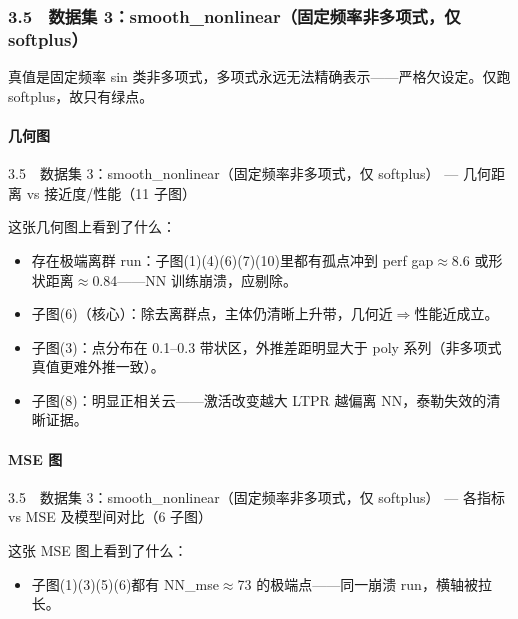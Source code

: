 \documentclass[UTF8,a4paper,11pt]{ctexart}
\begin{document}
\subsubsection{3.5　数据集 3：smooth\_nonlinear（固定频率非多项式，仅 softplus）}

真值是固定频率 sin 类非多项式，多项式永远无法精确表示------严格欠设定。仅跑 softplus，故只有绿点。

\paragraph{几何图}

3.5　数据集 3：smooth\_nonlinear（固定频率非多项式，仅 softplus） --- 几何距离 vs 接近度/性能（11 子图）

这张几何图上看到了什么：

\begin{itemize}
\item 存在极端离群 run：子图(1)(4)(6)(7)(10)里都有孤点冲到 perf gap$\approx$8.6 或形状距离$\approx$0.84------NN 训练崩溃，应剔除。
\end{itemize}

\begin{itemize}
\item 子图(6)（核心）：除去离群点，主体仍清晰上升带，几何近$\Rightarrow$性能近成立。
\end{itemize}

\begin{itemize}
\item 子图(3)：点分布在 0.1--0.3 带状区，外推差距明显大于 poly 系列（非多项式真值更难外推一致）。
\end{itemize}

\begin{itemize}
\item 子图(8)：明显正相关云------激活改变越大 LTPR 越偏离 NN，泰勒失效的清晰证据。
\end{itemize}

\paragraph{MSE 图}

3.5　数据集 3：smooth\_nonlinear（固定频率非多项式，仅 softplus） --- 各指标 vs MSE 及模型间对比（6 子图）

这张 MSE 图上看到了什么：

\begin{itemize}
\item 子图(1)(3)(5)(6)都有 NN\_mse$\approx$73 的极端点------同一崩溃 run，横轴被拉长。
\end{itemize}
\end{document}
